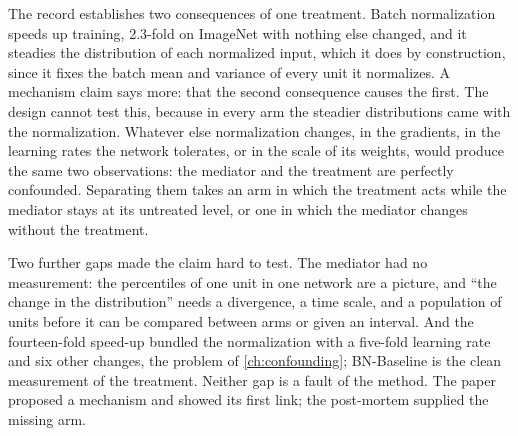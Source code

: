 \begin{refsection}
\begin{experiment}
\end{experiment}

The record establishes two consequences of one treatment. Batch normalization speeds up training, 2.3-fold on ImageNet with nothing else changed, and it steadies the distribution of each normalized input, which it does by construction, since it fixes the batch mean and variance of every unit it normalizes. A mechanism claim says more: that the second consequence causes the first. The design cannot test this, because in every arm the steadier distributions came with the normalization. Whatever else normalization changes, in the gradients, in the learning rates the network tolerates, or in the scale of its weights, would produce the same two observations: the mediator and the treatment are perfectly confounded. Separating them takes an arm in which the treatment acts while the mediator stays at its untreated level, or one in which the mediator changes without the treatment.

Two further gaps made the claim hard to test. The mediator had no measurement: the percentiles of one unit in one network are a picture, and \enquote{the change in the distribution} needs a divergence, a time scale, and a population of units before it can be compared between arms or given an interval. And the fourteen-fold speed-up bundled the normalization with a five-fold learning rate and six other changes, the problem of \cref{ch:confounding}; BN-Baseline is the clean measurement of the treatment. Neither gap is a fault of the method. The paper proposed a mechanism and showed its first link; the post-mortem supplied the missing arm.


\end{refsection}
